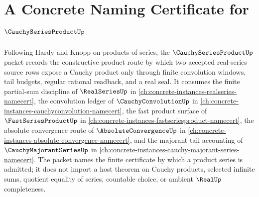 \chapter{A Concrete Naming Certificate for $\CauchySeriesProductUp$}
\label{ch:concrete-instances-cauchy-series-product-namecert}

Following Hardy and Knopp on products of series, the $\CauchySeriesProductUp$ packet records the constructive product route by which two accepted real-series source rows expose a Cauchy product only through finite convolution windows, tail budgets, regular rational readback, and a real seal. It consumes the finite partial-sum discipline of $\RealSeriesUp$ in \autoref{ch:concrete-instances-realseries-namecert}, the convolution ledger of $\CauchyConvolutionUp$ in \autoref{ch:concrete-instances-cauchyconvolution-namecert}, the fast product surface of $\FastSeriesProductUp$ in \autoref{ch:concrete-instances-fastseriesproduct-namecert}, the absolute convergence route of $\AbsoluteConvergenceUp$ in \autoref{ch:concrete-instances-absolute-convergence-namecert}, and the majorant tail accounting of $\CauchyMajorantSeriesUp$ in \autoref{ch:concrete-instances-cauchy-majorant-series-namecert}. The packet names the finite certificate by which a product series is admitted; it does not import a host theorem on Cauchy products, selected infinite sums, quotient equality of series, countable choice, or ambient $\RealUp$ completeness.

